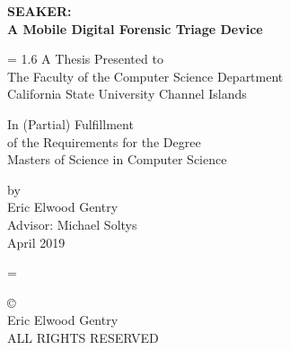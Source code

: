 \documentclass[12pt]{article}
\newcommand{\A}{\mathcal{A}}
\begin{document}
\begin{titlepage}
\begin{center}
{\Large \bfseries SEAKER:\protect\\A Mobile Digital Forensic Triage Device \par}

\vspace{2 cm}
\baselineskip = 1.6\baselineskip
A Thesis Presented to \\
The Faculty of the Computer Science Department\\
California State University Channel Islands

\vspace{1 cm}

In (Partial) Fulfillment\\
of the Requirements for the Degree\\
Masters of Science in Computer Science\\

\vspace{1 cm}

by \\
Eric Elwood Gentry\\
Advisor: Michael Soltys\\
April 2019
\end{center}
\end{titlepage}
\baselineskip = \baselineskip

\newpage
\null
\vfill
\begin{flushleft}
\copyright{}\\
Eric Elwood Gentry\\
ALL RIGHTS RESERVED
\end{flushleft}
\newpage
\end{document}
